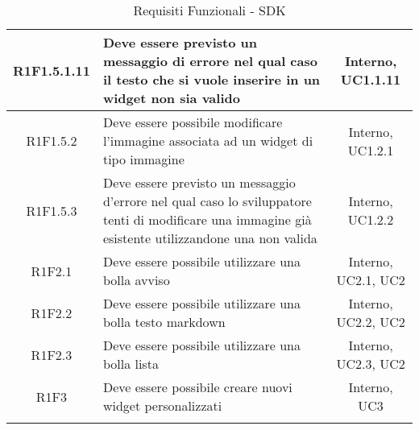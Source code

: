 \begin{longtable}{|c|>{\centering}m{7cm}|c|}
		\hline
		R1F1.5.1.11 & Deve essere previsto un messaggio di errore nel qual caso il testo che si vuole inserire in un widget non sia valido & Interno, UC1.1.11 \\
		\hline
		R1F1.5.2 & Deve essere possibile modificare l'immagine associata ad un widget di tipo immagine & Interno, UC1.2.1 \\
		\hline
		R1F1.5.3 & Deve essere previsto un messaggio d'errore nel qual caso lo sviluppatore tenti di modificare una immagine già esistente utilizzandone una non valida & Interno, UC1.2.2 \\
		\hline
			R1F2.1 & Deve essere possibile utilizzare una bolla avviso & Interno, UC2.1, UC2 \\
			\hline
			R1F2.2 & Deve essere possibile utilizzare una bolla testo markdown & Interno, UC2.2, UC2 \\
			\hline
			R1F2.3 & Deve essere possibile utilizzare una bolla lista & Interno, UC2.3, UC2 \\
			\hline
			R1F3 & Deve essere possibile creare nuovi widget personalizzati & Interno, UC3 \\
			\hline
\caption[Requisiti Funzionali - SDK]{Requisiti Funzionali - SDK}
\label{tabella: Requisiti Funzionali - SDK}
\end{longtable}
\endgroup
\clearpage